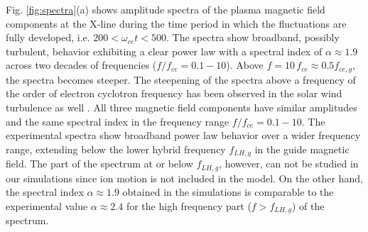 \documentclass[aip,preprint]{revtex4-1}
\begin{document}
Fig. \ref{fig:spectra}(a) shows amplitude spectra of the plasma magnetic field components at the X-line during the time period in which the fluctuations are fully developed, i.e. $200 <\omega_{ce}t<500$. The spectra show broadband, possibly turbulent, behavior exhibiting a clear power law with a spectral index of $\alpha\approx1.9$ across two decades of frequencies ($f/f_{ce}=0.1-10$). Above $f=10\,f_{ce}\approx 0.5f_{ce,g}$, the spectra becomes steeper. The steepening of the spectra above a frequency of the order of electron cyclotron frequency has been observed in the solar wind turbulence as well \cite{alexandrova2009}.
All three magnetic field components have similar amplitudes and the same spectral index in the frequency range $f/f_{ce}=0.1-10$. The experimental spectra show broadband power law behavior over a wider frequency range, extending below the lower hybrid frequency $f_{LH,g}$ in the guide magnetic field. The part of the spectrum at or below $f_{LH,g}$, however,  can not be studied  in our simulations since ion motion is not included in the model.
On the other hand, the spectral index $\alpha \approx 1.9$ obtained in the simulations is comparable to the experimental value $\alpha \approx 2.4$ for the high frequency part ($f > f_{LH,g}$) of the spectrum.
\end{document}
